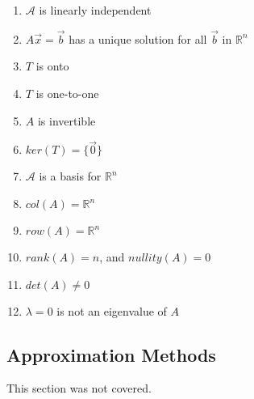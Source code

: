 \documentclass[10pt]{article}
\begin{document}
\begin{enumerate}
\begin{enumerate}
\item $\mathcal{A}$ is linearly independent
\item $A\vec{x} = \vec{b}$ has a unique solution for all $\vec{b}$ in $\mathbb{R}^n$
\item $T$ is onto
\item $T$ is one-to-one
\item $A$ is invertible
\item $ker(T) = \lbrace \vec{0} \rbrace$
\item $\mathcal{A}$ is a basis for $\mathbb{R}^n$
\item $col(A) = \mathbb{R}^n$
\item $row(A) = \mathbb{R}^n$
\item $rank(A) = n$, and $nullity(A) = 0$
\item $det(A) \neq 0$
\item $\lambda = 0$ is not an eigenvalue of $A$
\end{enumerate}
\end{enumerate}
\subsection{Approximation Methods}
This section was not covered.
\end{document}
